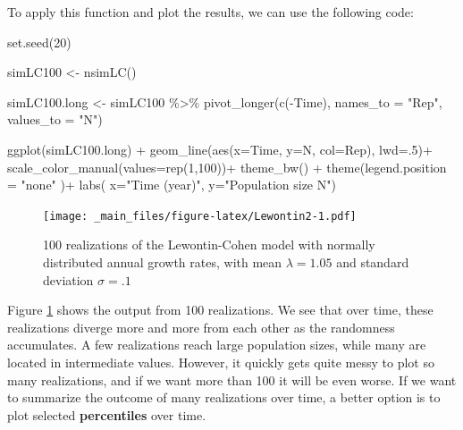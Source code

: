 \documentclass[
]{book}
\newenvironment{Shaded}{\begin{snugshade}}{\end{snugshade}}
\newcommand{\AttributeTok}[1]{\textcolor[rgb]{0.77,0.63,0.00}{#1}}
\newcommand{\DecValTok}[1]{\textcolor[rgb]{0.00,0.00,0.81}{#1}}
\newcommand{\FunctionTok}[1]{\textcolor[rgb]{0.00,0.00,0.00}{#1}}
\newcommand{\NormalTok}[1]{#1}
\newcommand{\OtherTok}[1]{\textcolor[rgb]{0.56,0.35,0.01}{#1}}
\newcommand{\SpecialCharTok}[1]{\textcolor[rgb]{0.00,0.00,0.00}{#1}}
\newcommand{\StringTok}[1]{\textcolor[rgb]{0.31,0.60,0.02}{#1}}
\begin{document}
To apply this function and plot the results, we can use the following code:

\begin{Shaded}
\begin{Highlighting}[]
\FunctionTok{set.seed}\NormalTok{(}\DecValTok{20}\NormalTok{) }

\NormalTok{simLC100 }\OtherTok{\textless{}{-}} \FunctionTok{nsimLC}\NormalTok{()}

\NormalTok{simLC100.long }\OtherTok{\textless{}{-}}\NormalTok{ simLC100 }\SpecialCharTok{\%\textgreater{}\%} \FunctionTok{pivot\_longer}\NormalTok{(}\FunctionTok{c}\NormalTok{(}\SpecialCharTok{{-}}\NormalTok{Time),}
               \AttributeTok{names\_to =} \StringTok{"Rep"}\NormalTok{, }\AttributeTok{values\_to =} \StringTok{"N"}\NormalTok{)}

\FunctionTok{ggplot}\NormalTok{(simLC100.long) }\SpecialCharTok{+} 
  \FunctionTok{geom\_line}\NormalTok{(}\FunctionTok{aes}\NormalTok{(}\AttributeTok{x=}\NormalTok{Time, }\AttributeTok{y=}\NormalTok{N, }\AttributeTok{col=}\NormalTok{Rep), }\AttributeTok{lwd=}\NormalTok{.}\DecValTok{5}\NormalTok{)}\SpecialCharTok{+}
  \FunctionTok{scale\_color\_manual}\NormalTok{(}\AttributeTok{values=}\FunctionTok{rep}\NormalTok{(}\DecValTok{1}\NormalTok{,}\DecValTok{100}\NormalTok{))}\SpecialCharTok{+}
  \FunctionTok{theme\_bw}\NormalTok{() }\SpecialCharTok{+}
   \FunctionTok{theme}\NormalTok{(}\AttributeTok{legend.position =} \StringTok{"none"}\NormalTok{ )}\SpecialCharTok{+}
  \FunctionTok{labs}\NormalTok{( }\AttributeTok{x=}\StringTok{"Time (year)"}\NormalTok{, }\AttributeTok{y=}\StringTok{"Population size N"}\NormalTok{)  }
\end{Highlighting}
\end{Shaded}

\begin{figure}
\centering
\texttt{[image: \_main\_files/figure-latex/Lewontin2-1.pdf]}
\caption{\label{fig:Lewontin2}100 realizations of the Lewontin-Cohen model with normally distributed annual growth rates, with mean \(\lambda=1.05\) and standard deviation \(\sigma=.1\)}
\end{figure}

Figure \ref{fig:Lewontin2} shows the output from 100 realizations. We see that over time, these realizations diverge more and more from each other as the randomness accumulates. A few realizations reach large population sizes, while many are located in intermediate values. However, it quickly gets quite messy to plot so many realizations, and if we want more than 100 it will be even worse. If we want to summarize the outcome of many realizations over time, a better option is to plot selected \textbf{percentiles} over time.
\end{document}
